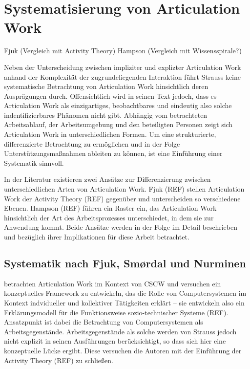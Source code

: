 \section{Systematisierung von Articulation Work} %
\label{sec:systematisierung_articulation_work}

Fjuk (Vergleich mit Activity Theory)
Hampson (Vergleich mit Wissensspirale?)

Neben der Unterscheidung zwischen impliziter und explizter Articulation Work anhand der Komplexität der zugrundeliegenden Interaktion führt Strauss keine systematische Betrachtung von Articulation Work hinsichtlich deren Ausprägungen durch. Offensichtlich wird in seinen Text jedoch, dass es Articulation Work als einzigartiges, beobachtbares und eindeutig also solche indentifizierbares Phänomen nicht gibt. Abhängig vom betrachteten Arbeitsablauf, der Arbeitsumgebung und den beteiligten Personen zeigt sich Articulation Work in unterschiedlichen Formen. Um eine strukturierte, differenzierte Betrachtung zu ermöglichen und in der Folge Unterstützungsmaßnahmen ableiten zu können, ist eine Einführung einer Systematik sinnvoll.

In der Literatur existieren zwei Ansätze zur Differenzierung zwischen unterschiedlichen Arten von Articulation Work. Fjuk (REF) stellen Articulation Work der Activity Theory (REF) gegenüber und unterscheiden so verschiedene Ebenen. Hampson (REF) führen ein Raster ein, das Articulation Work hinsichtlich der Art des Arbeitsprozesses unterschiedet, in dem sie zur Anwendung kommt. Beide Ansätze werden in der Folge im Detail beschrieben und bezüglich ihrer Implikationen für diese Arbeit betrachtet.

\subsection{Systematik nach Fjuk, Smørdal und Nurminen}
\label{sub:systematik_fjuk}

\citet{Fjuk97} betrachten Articulation Work im Kontext von \gls{CSCW} und versuchen ein konzeptuelles Framework zu entwickeln, das die Rolle von Computersystemen im Kontext indvidueller und kollektiver Tätigkeiten erklärt -- sie entwickeln also ein Erklärungsmodell für die Funktionsweise sozio-technischer Systeme (REF). Ansatzpunkt ist dabei die Betrachtung von Computersystemen als Arbeitsgegenstände. Arbeitsgegenstände als solche werden von Strauss jedoch nicht explizit in seinen Ausführungen berücksichtigt, so dass sich hier eine konzeptuelle Lücke ergibt. Diese versuchen die Autoren mit der Einführung der Activity Theory (REF) zu schließen.  

